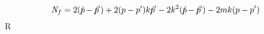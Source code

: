 \begin{equation}
\textit{N}_{f}=2(p\hspace{-0.2cm}/-p\hspace{-0.2cm}/')+2(p-p')kp\hspace{-0.2cm}/'
-2k^{2}(p\hspace{-0.2cm}/-p\hspace{-0.2cm}/')-2mk(p-p')
\end{equation}R

